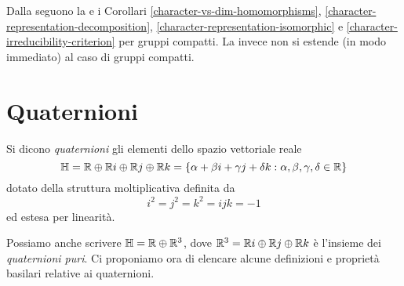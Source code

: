 Dalla  seguono la  e i Corollari \ref{character-vs-dim-homomorphisms}, \ref{character-representation-decomposition}, \ref{character-representation-isomorphic} e \ref{character-irreducibility-criterion} per gruppi compatti. La  invece non si estende (in modo immediato) al caso di gruppi compatti.

\section{Quaternioni}
\begin{definition}
Si dicono \emph{quaternioni} gli elementi dello spazio vettoriale reale
$$
\mathbb{H}=\mathbb{R}\oplus\mathbb{R}i\oplus\mathbb{R}j\oplus\mathbb{R}k=\{\alpha+\beta i+\gamma j+\delta k:\alpha,\beta,\gamma,\delta\in\mathbb{R}\}
$$
dotato della struttura moltiplicativa definita da
$$
i^2=j^2=k^2=ijk=-1
$$
ed estesa per linearità.
\end{definition}
Possiamo anche scrivere $\mathbb{H}=\mathbb{R}\oplus\mathbb{R}^3$, dove $\mathbb{R}^3=\mathbb{R}i\oplus\mathbb{R}j\oplus\mathbb{R}k$ è l'insieme dei \emph{quaternioni puri}. Ci proponiamo ora di elencare alcune definizioni e proprietà basilari relative ai quaternioni.
